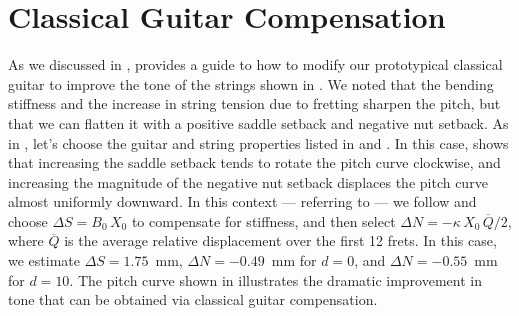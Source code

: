 %
%
%

 \section{Classical Guitar Compensation\label{sct:comp}}

As we discussed in ,  provides a guide to how to modify our prototypical classical guitar to improve the tone of the strings shown in . We noted that the bending stiffness and the increase in string tension due to fretting sharpen the pitch, but that we can flatten it with a positive saddle setback and negative nut setback. As in , let's choose the guitar and string properties listed in  and . In this case,  shows that increasing the saddle setback tends to rotate the pitch curve clockwise, and increasing the magnitude of the negative nut setback displaces the pitch curve almost uniformly downward. In this context --- referring to  --- we follow  and choose $\Delta S = B_0\, X_0$ to compensate for stiffness, and then select $\Delta N = - \kappa\, X_0\, \overline{Q} / 2$, where $\overline{Q}$ is the average relative displacement over the first 12 frets. In this case, we estimate $\Delta S = 1.75$~mm, $\Delta N = -0.49$~mm for $d = 0$, and $\Delta N = -0.55$~mm for $d = 10$. The pitch curve shown in  illustrates the dramatic improvement in tone that can be obtained via classical guitar compensation.

